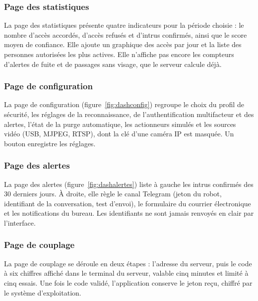 \subsubsection{Page des statistiques}

La page des statistiques présente quatre indicateurs pour la période choisie : le nombre d'accès accordés, d'accès refusés et d'intrus confirmés, ainsi que le score moyen de confiance. Elle ajoute un graphique des accès par jour et la liste des personnes autorisées les plus actives. Elle n'affiche pas encore les compteurs d'alertes de fuite et de passages sans visage, que le serveur calcule déjà.

\subsubsection{Page de configuration}

La page de configuration (figure~\ref{fig:dashconfig}) regroupe le choix du profil de sécurité, les réglages de la reconnaissance, de l'authentification multifacteur et des alertes, l'état de la purge automatique, les actionneurs simulés et les sources vidéo (USB, MJPEG, RTSP), dont la clé d'une caméra IP est masquée. Un bouton enregistre les réglages.


\subsubsection{Page des alertes}

La page des alertes (figure~\ref{fig:dashalertes}) liste à gauche les intrus confirmés des 30 derniers jours. À droite, elle règle le canal Telegram (jeton du robot, identifiant de la conversation, test d'envoi), le formulaire du courrier électronique et les notifications du bureau. Les identifiants ne sont jamais renvoyés en clair par l'interface.


\subsubsection{Page de couplage}

La page de couplage se déroule en deux étapes : l'adresse du serveur, puis le code à six chiffres affiché dans le terminal du serveur, valable cinq minutes et limité à cinq essais. Une fois le code validé, l'application conserve le jeton reçu, chiffré par le système d'exploitation.

